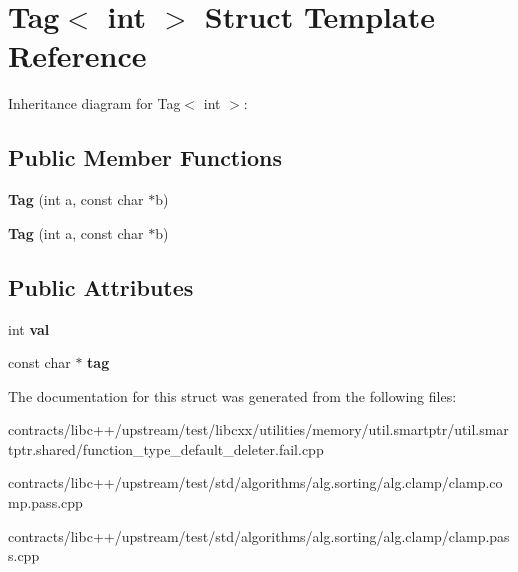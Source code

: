 \hypertarget{struct_tag}{}\section{Tag$<$ int $>$ Struct Template Reference}
\label{struct_tag}


Inheritance diagram for Tag$<$ int $>$\+:
\subsection*{Public Member Functions}
\begin{DoxyCompactItemize}
\item 
\mbox{\label{struct_tag_a57c2024342ad61d77acacfeb5a4741a1}} 
{\bfseries Tag} (int a, const char $\ast$b)
\item 
\mbox{\label{struct_tag_a57c2024342ad61d77acacfeb5a4741a1}} 
{\bfseries Tag} (int a, const char $\ast$b)
\end{DoxyCompactItemize}
\subsection*{Public Attributes}
\begin{DoxyCompactItemize}
\item 
\mbox{\label{struct_tag_a358d58a446cce9105a37225d952df2c8}} 
int {\bfseries val}
\item 
\mbox{\label{struct_tag_ae9b61495d2e9f1089059cc0d03d6f820}} 
const char $\ast$ {\bfseries tag}
\end{DoxyCompactItemize}


The documentation for this struct was generated from the following files\+:\begin{DoxyCompactItemize}
\item 
contracts/libc++/upstream/test/libcxx/utilities/memory/util.\+smartptr/util.\+smartptr.\+shared/function\+\_\+type\+\_\+default\+\_\+deleter.\+fail.\+cpp\item 
contracts/libc++/upstream/test/std/algorithms/alg.\+sorting/alg.\+clamp/clamp.\+comp.\+pass.\+cpp\item 
contracts/libc++/upstream/test/std/algorithms/alg.\+sorting/alg.\+clamp/clamp.\+pass.\+cpp\end{DoxyCompactItemize}
